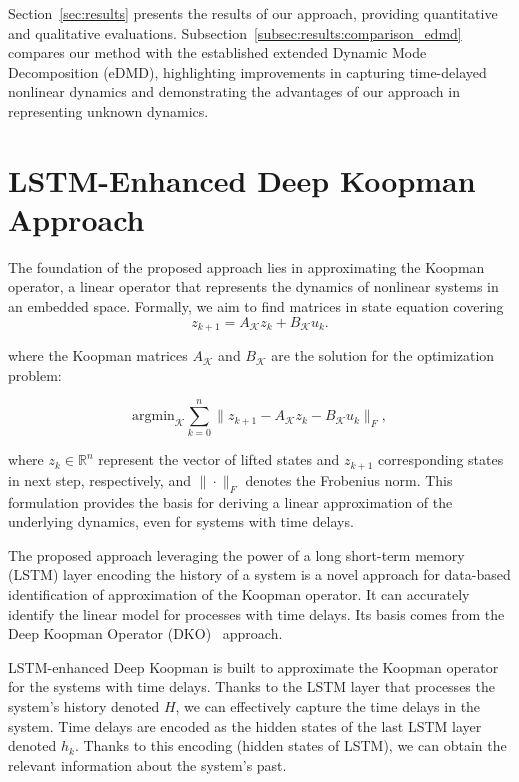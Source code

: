 \documentclass[conference]{IEEEtran}
\begin{document}
Section~\ref{sec:results} presents the results of our approach, providing quantitative and qualitative evaluations. Subsection~\ref{subsec:results:comparison_edmd} compares our method with the established extended Dynamic Mode Decomposition (eDMD), highlighting improvements in capturing time-delayed nonlinear dynamics and demonstrating the advantages of our approach in representing unknown dynamics.


\section{LSTM-Enhanced Deep Koopman Approach}\label{sec:methodology}

The foundation of the proposed approach lies in approximating the Koopman operator, a linear operator that represents the dynamics of nonlinear systems in an embedded space.
Formally, we aim to find matrices in state equation covering
\begin{equation}
    z_{k+1} = A_\mathcal{K}z_k + B_\mathcal{K}u_k.
\end{equation}

where the Koopman matrices \(A_\mathcal{K} \) and \( B_\mathcal{K} \) are the solution for the optimization problem:

\begin{equation}
    \mathrm{argmin}_{\mathcal{K}} \sum_{k=0}^{n} \| z_{k+1} - A_\mathcal{K}z_{k} - B_\mathcal{K}u_k \|_F,
\end{equation}

where \( z_{k} \in \mathbb{R}^n\) represent the vector of lifted states and \( z_{k+1} \) corresponding states in next step, respectively, and \( \|\cdot \| _F\) denotes the Frobenius norm. This formulation provides the basis for deriving a linear approximation of the underlying dynamics, even for systems with time delays.


The proposed approach leveraging the power of a long short-term memory (LSTM) layer encoding the history of a system is a novel approach for data-based identification of approximation of the Koopman operator. It can accurately identify the linear model for processes with time delays. Its basis comes from the Deep Koopman Operator (DKO)~\cite{lusch2018deep} approach.

LSTM-enhanced Deep Koopman is built to approximate the Koopman operator for the systems with time delays. Thanks to the LSTM layer that processes the system's history denoted \(H\), we can effectively capture the time delays in the system. Time delays are encoded as the hidden states of the last LSTM layer denoted \(h_k\). Thanks to this encoding (hidden states of LSTM), we can obtain the relevant information about the system's past.
\end{document}
